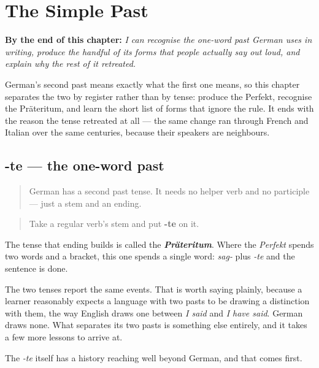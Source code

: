 
\chapter{The Simple Past}
\label{ch:ge-praeteritum}

\begin{chapteropening}
\textbf{By the end of this chapter:} \emph{I can recognise the one-word past German uses in writing, produce the handful of its forms that people actually say out loud, and explain why the rest of it retreated.}

German's second past means exactly what the first one means, so this chapter separates the two by register rather than by tense: produce the Perfekt, recognise the Präteritum, and learn the short list of forms that ignore the rule. It ends with the reason the tense retreated at all — the same change ran through French and Italian over the same centuries, because their speakers are neighbours.
\end{chapteropening}

\section[-te]{-te — the one-word past}

\label{lesson:GE-C15-praeteritum}



\begin{quote}
German has a second past tense. It needs no helper verb and no participle — just a stem and an ending.
\end{quote}

\begin{grammarlens}[title={Grammar Lens: add -te to the stem}]
\begin{quote}
Take a regular verb's stem and put \textbf{-te} on it.
\end{quote}

The tense that ending builds is called the \emph{\textbf{Präteritum}}. Where the \emph{Perfekt} spends two words and a bracket, this one spends a single word: \emph{sag-} plus \emph{-te} and the sentence is done.

The two tenses report the same events. That is worth saying plainly, because a learner reasonably expects a language with two pasts to be drawing a distinction with them, the way English draws one between \emph{I said} and \emph{I have said}. German draws none. What separates its two pasts is something else entirely, and it takes a few more lessons to arrive at.

The \emph{-te} itself has a history reaching well beyond German, and that comes first.
\end{grammarlens}

